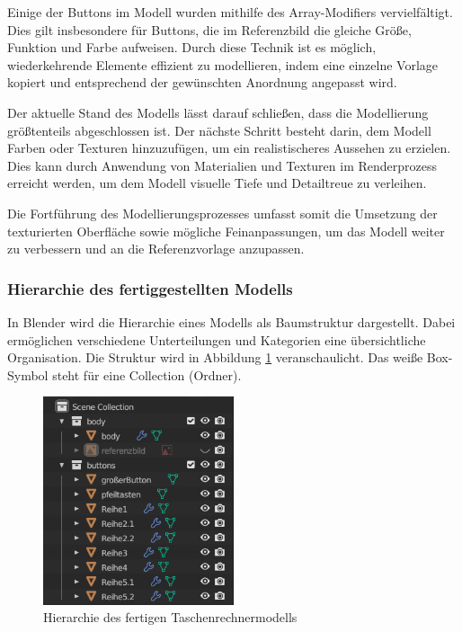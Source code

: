 Einige der Buttons im Modell wurden mithilfe des Array-Modifiers vervielfältigt. Dies gilt insbesondere für Buttons, die
im Referenzbild die gleiche Größe, Funktion und Farbe aufweisen. Durch diese Technik ist es möglich, wiederkehrende
Elemente effizient zu modellieren, indem eine einzelne Vorlage kopiert und entsprechend der gewünschten Anordnung angepasst wird.

Der aktuelle Stand des Modells lässt darauf schließen, dass die Modellierung größtenteils abgeschlossen ist. Der nächste
Schritt besteht darin, dem Modell Farben oder Texturen hinzuzufügen, um ein realistischeres Aussehen zu erzielen. Dies
kann durch Anwendung von Materialien und Texturen im Renderprozess erreicht werden, um dem Modell visuelle Tiefe und
Detailtreue zu verleihen.

Die Fortführung des Modellierungsprozesses umfasst somit die Umsetzung der texturierten Oberfläche sowie mögliche
Feinanpassungen, um das Modell weiter zu verbessern und an die Referenzvorlage anzupassen.

\subsubsection*{Hierarchie des fertiggestellten Modells}
In Blender wird die Hierarchie eines Modells als Baumstruktur dargestellt. Dabei ermöglichen verschiedene Unterteilungen
und Kategorien eine übersichtliche Organisation. Die Struktur wird in Abbildung
\ref{fig:hierarchie} veranschaulicht. Das weiße Box-Symbol steht für eine Collection (Ordner).

\begin{figure}[H]
    \centering
    \includegraphics[width=0.5\textwidth]{images/hierarchietaschenrechner.png}
    \caption{Hierarchie des fertigen Taschenrechnermodells}
    \label{fig:hierarchie}
\end{figure}

